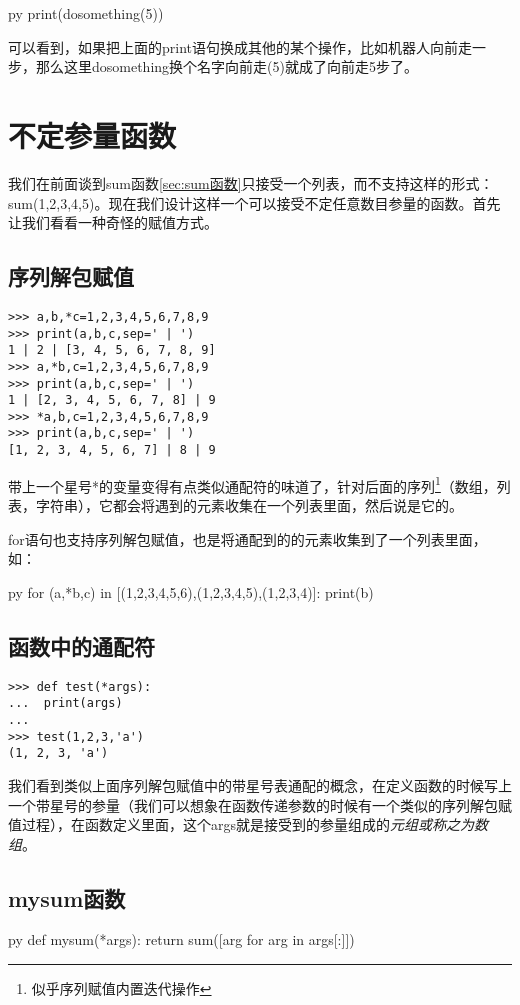 \documentclass[12pt,oneside]{book}
\begin{document}
\begin{common-format}
\begin{xverbatim}[129]{py}
print(dosomething(5))
\end{xverbatim}
可以看到，如果把上面的print语句换成其他的某个操作，比如机器人向前走一步，那么这里dosomething换个名字向前走(5)就成了向前走5步了。

\section{不定参量函数}
我们在前面谈到sum函数\ref{sec:sum函数}只接受一个列表，而不支持这样的形式：sum(1,2,3,4,5)。现在我们设计这样一个可以接受不定任意数目参量的函数。首先让我们看看一种奇怪的赋值方式。

\subsection{序列解包赋值}
\label{sec:序列解包赋值}
\begin{Verbatim}
>>> a,b,*c=1,2,3,4,5,6,7,8,9
>>> print(a,b,c,sep=' | ')
1 | 2 | [3, 4, 5, 6, 7, 8, 9]
>>> a,*b,c=1,2,3,4,5,6,7,8,9
>>> print(a,b,c,sep=' | ')
1 | [2, 3, 4, 5, 6, 7, 8] | 9
>>> *a,b,c=1,2,3,4,5,6,7,8,9
>>> print(a,b,c,sep=' | ')
[1, 2, 3, 4, 5, 6, 7] | 8 | 9
\end{Verbatim}
带上一个星号*的变量变得有点类似通配符的味道了，针对后面的序列\footnote{似乎序列赋值内置迭代操作}（数组，列表，字符串），它都会将遇到的元素收集在一个列表里面，然后说是它的。

for语句也支持序列解包赋值，也是将通配到的的元素收集到了一个列表里面，如：
\begin{xverbatim}[129]{py}
for (a,*b,c) in [(1,2,3,4,5,6),(1,2,3,4,5),(1,2,3,4)]:
    print(b)
\end{xverbatim}


\subsection{函数中的通配符}
\begin{Verbatim}
>>> def test(*args):
...  print(args)
... 
>>> test(1,2,3,'a')
(1, 2, 3, 'a')
\end{Verbatim}
我们看到类似上面序列解包赋值中的带星号表通配的概念，在定义函数的时候写上一个带星号的参量（我们可以想象在函数传递参数的时候有一个类似的序列解包赋值过程），在函数定义里面，这个args就是接受到的参量组成的\emph{元组或称之为数组}。


\subsection{mysum函数}
\begin{xverbatim}[129]{py}
def mysum(*args):
    return sum([arg for arg in args[:]])


\end{xverbatim}
\end{common-format}
\end{document}
